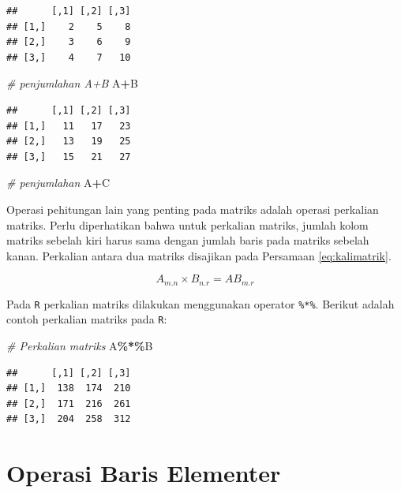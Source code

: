 \documentclass[
]{book}
\newenvironment{Shaded}{\begin{snugshade}}{\end{snugshade}}
\newcommand{\CommentTok}[1]{\textcolor[rgb]{0.56,0.35,0.01}{\textit{#1}}}
\newcommand{\NormalTok}[1]{#1}
\newcommand{\SpecialCharTok}[1]{\textcolor[rgb]{0.81,0.36,0.00}{\textbf{#1}}}
\theoremstyle{definition}
\theoremstyle{definition}
\theoremstyle{definition}
\theoremstyle{definition}
\theoremstyle{remark}
\begin{document}
\begin{verbatim}
##      [,1] [,2] [,3]
## [1,]    2    5    8
## [2,]    3    6    9
## [3,]    4    7   10
\end{verbatim}

\begin{Shaded}
\begin{Highlighting}[]
\CommentTok{\# penjumlahan A+B}
\NormalTok{A}\SpecialCharTok{+}\NormalTok{B}
\end{Highlighting}
\end{Shaded}

\begin{verbatim}
##      [,1] [,2] [,3]
## [1,]   11   17   23
## [2,]   13   19   25
## [3,]   15   21   27
\end{verbatim}

\begin{Shaded}
\begin{Highlighting}[]
\CommentTok{\# penjumlahan}
\NormalTok{A}\SpecialCharTok{+}\NormalTok{C}
\end{Highlighting}
\end{Shaded}

Operasi pehitungan lain yang penting pada matriks adalah operasi perkalian matriks. Perlu diperhatikan bahwa untuk perkalian matriks, jumlah kolom matriks sebelah kiri harus sama dengan jumlah baris pada matriks sebelah kanan. Perkalian antara dua matriks disajikan pada Persamaan \eqref{eq:kalimatrik}.

\begin{equation}
A_{m.n}\times B_{n.r}=AB_{m.r}
  \label{eq:kalimatrik}
\end{equation}

Pada \texttt{R} perkalian matriks dilakukan menggunakan operator \texttt{\%*\%}. Berikut adalah contoh perkalian matriks pada \texttt{R}:

\begin{Shaded}
\begin{Highlighting}[]
\CommentTok{\# Perkalian matriks}
\NormalTok{A}\SpecialCharTok{\%*\%}\NormalTok{B}
\end{Highlighting}
\end{Shaded}

\begin{verbatim}
##      [,1] [,2] [,3]
## [1,]  138  174  210
## [2,]  171  216  261
## [3,]  204  258  312
\end{verbatim}

\hypertarget{rowoperation}{%
\section{Operasi Baris Elementer}\label{rowoperation}}
\end{document}
